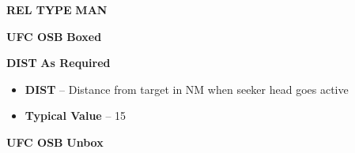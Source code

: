 \documentclass[fontInter]{TechCheck}
\begin{document}
\begin{longtableitemize}
{\begin{subenumerate}
				\item \textbf{REL TYPE} \dotfill \textbf{MAN}
    			\item \textbf{UFC OSB} \dotfill \textbf{Boxed}
       			\item \textbf{DIST} \dotfill \textbf{As Required}
				\begin{itemize}
					\item \textbf{DIST} -- Distance from target in NM when seeker head goes active
         			\item \textbf{Typical Value} -- 15
				\end{itemize}
				\item \textbf{UFC OSB} \dotfill \textbf{Unbox}
			\end{subenumerate}}
	\end{longtableitemize}

	\clearpage
\end{document}
